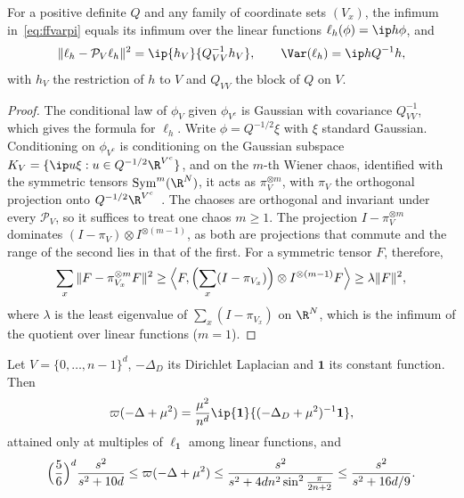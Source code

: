 \begin{lemma}\label{lem:chaos}
For a positive definite $Q$ and any family of coordinate sets $(V_x)$, the
infimum in~\eqref{eq:ffvarpi} equals its infimum over the linear functions
$\ell_h(\phi)=\ip h\phi$, and
\[
\|\ell_h-\mathcal P_V\ell_h\|^2=\ip{h_V}{Q_{VV}^{-1}h_V},\qquad
\Var(\ell_h)=\ip h{Q^{-1}h},
\]
with $h_V$ the restriction of $h$ to $V$ and $Q_{VV}$ the block of $Q$ on $V$.
\end{lemma}

\begin{proof}
The conditional law of $\phi_V$ given $\phi_{V^c}$ is Gaussian with covariance
$Q_{VV}^{-1}$, which gives the formula for $\ell_h$. Write $\phi=Q^{-1/2}\xi$ with
$\xi$ standard Gaussian. Conditioning on $\phi_{V^c}$ is conditioning on the
Gaussian subspace $K_V=\{\ip u\xi:u\in Q^{-1/2}\R^{V^c}\}$, and on the $m$-th
Wiener chaos, identified with the symmetric tensors $\mathrm{Sym}^m(\R^N)$, it
acts as $\pi_V^{\otimes m}$, with $\pi_V$ the orthogonal projection onto $Q^{-1/2}
\R^{V^c}$~\cite[Ch.~4]{Jan97}. The chaoses are orthogonal and invariant under
every $\mathcal P_V$, so it suffices to treat one chaos $m\ge1$. The projection
$I-\pi_V^{\otimes m}$ dominates $(I-\pi_V)\otimes I^{\otimes(m-1)}$, as both are
projections that commute and the range of the second lies in that of the
first. For a symmetric tensor $F$, therefore,
\[
\sum_x\|F-\pi_{V_x}^{\otimes m}F\|^2\ge\Bigl\langle F,\Bigl(\sum_x(I-\pi_{V_x})\Bigr)
\otimes I^{\otimes(m-1)}F\Bigr\rangle\ge\lambda\|F\|^2,
\]
where $\lambda$ is the least eigenvalue of $\sum_x(I-\pi_{V_x})$ on $\R^N$, which is
the infimum of the quotient over linear functions ($m=1$).
\end{proof}

\begin{theorem}\label{thm:free}
Let $V=\{0,\dots,n-1\}^d$, $-\Delta_D$ its Dirichlet Laplacian and $\mathbf 1$ its
constant function. Then
\[
\varpi(-\Delta+\mu^2)=\frac{\mu^2}{n^d}\ip{\mathbf 1}{(-\Delta_D+\mu^2)^{-1}\mathbf 1},
\]
attained only at multiples of $\ell_{\mathbf 1}$ among linear functions, and
\[
\Bigl(\frac56\Bigr)^d\frac{s^2}{s^2+10d}\le\varpi(-\Delta+\mu^2)\le\frac{s^2}
{s^2+4dn^2\sin^2\frac\pi{2n+2}}\le\frac{s^2}{s^2+16d/9}.
\]
\end{theorem}

